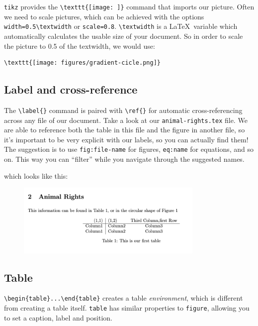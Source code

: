 \verb|tikz| provides the \verb|\texttt{[image: ]}| command that imports our picture.
Often we need to scale pictures, which can be achieved with the options \verb|width=0.5\textwidth| or \verb|scale=0.8|.
\verb|\textwidth| is a \LaTeX\ variable which automatically calculates the usable size of your document.
So in order to scale the picture to 0.5 of the textwidth, we would use:
\begin{lstlisting}
\texttt{[image: figures/gradient-cicle.png]}
\end{lstlisting}

\subsection{Label and cross-reference}
The \verb|\label{}| command is paired with \verb|\ref{}| for automatic cross-referencing across any file of our document.
Take a look at our \verb|animal-rights.tex| file.
We are able to reference both the table in this file and the figure in another file, so it's important to be very explicit with our labels, so you can actually find them!
The suggestion is to use \verb|fig:file-name| for figures, \verb|eq:name| for equations, and so on.
This way you can ``filter'' while you navigate through the suggested names.


which looks like this:
\begin{figure}[h]
    \centering
        \includegraphics[width=0.8\textwidth]{figures/tables.png}
    \label{fig:tables}
\end{figure}

\subsection{Table}
\verb|\begin{table}...\end{table}| creates a table \emph{environment}, which is different from creating a table itself.
\verb|table| has similar properties to \verb|figure|, allowing you to set a caption, label and position.

